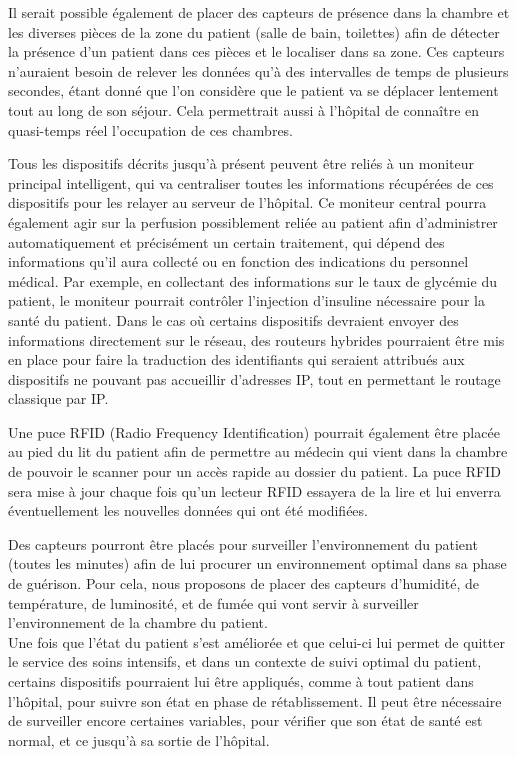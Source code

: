 \documentclass{article}
\begin{document}
Il serait possible également de placer des capteurs de présence dans la chambre et les diverses pièces de la zone du patient (salle de bain, toilettes) afin de détecter la présence d’un patient dans ces pièces et le localiser dans sa zone. Ces capteurs n’auraient besoin de relever les données qu'à des intervalles de temps de plusieurs secondes, étant donné que l’on considère que le patient va se déplacer lentement tout au long de son séjour. Cela permettrait aussi à l’hôpital de connaître en quasi-temps réel l’occupation de ces chambres.

Tous les dispositifs décrits jusqu’à présent peuvent être reliés à un moniteur principal intelligent, qui va centraliser toutes les informations récupérées de ces dispositifs pour les relayer au serveur de l’hôpital. Ce moniteur central pourra également agir sur la perfusion possiblement reliée au patient afin d’administrer automatiquement et précisément un certain traitement, qui dépend des informations qu'il aura collecté ou en fonction des indications du personnel médical. Par exemple, en collectant des informations sur le taux de glycémie du patient, le moniteur pourrait contrôler l’injection d’insuline nécessaire pour la santé du patient. Dans le cas où certains dispositifs devraient envoyer des informations directement sur le réseau, des routeurs hybrides pourraient être mis en place pour faire la traduction des identifiants qui seraient attribués aux dispositifs ne pouvant pas accueillir d'adresses IP, tout en permettant le routage classique par IP.

Une puce RFID (Radio Frequency Identification) \cite{RFID} pourrait également être placée au pied du lit du patient  afin de permettre au médecin qui vient dans la chambre de pouvoir le scanner pour un accès rapide au dossier du patient. La puce RFID sera mise à jour chaque fois qu'un lecteur RFID essayera de la lire et lui enverra éventuellement les nouvelles données qui ont été modifiées.

Des capteurs pourront être placés pour surveiller l’environnement du patient (toutes les minutes) afin de lui procurer un environnement optimal dans sa phase de guérison. Pour cela, nous proposons de placer des capteurs d’humidité, de température, de luminosité, \cite{HTL} et de fumée qui vont servir à surveiller l'environnement de la chambre du patient. 
\\

Une fois que l'état du patient s'est améliorée et que celui-ci lui permet de quitter le service des soins intensifs, et dans un contexte de suivi optimal du patient, certains dispositifs pourraient lui être appliqués, comme à tout patient dans l'hôpital, pour suivre son état en phase de rétablissement. Il peut être nécessaire de surveiller encore certaines variables, pour vérifier que son état de santé est normal, et ce jusqu’à sa sortie de l’hôpital. 
\end{document}
